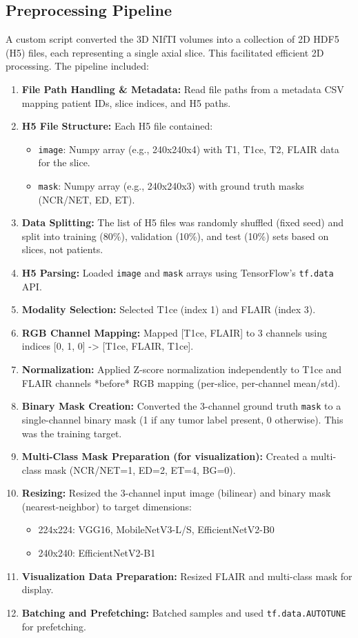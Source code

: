 \subsection{Preprocessing Pipeline}
A custom script converted the 3D NIfTI volumes into a collection of 2D HDF5 (H5) files, each representing a single axial slice. This facilitated efficient 2D processing. The pipeline included:
\begin{enumerate}
  \item \textbf{File Path Handling \& Metadata:} Read file paths from a metadata CSV mapping patient IDs, slice indices, and H5 paths.
  \item \textbf{H5 File Structure:} Each H5 file contained:
    \begin{itemize}
      \item \texttt{image}: Numpy array (e.g., 240x240x4) with T1, T1ce, T2, FLAIR data for the slice.
      \item \texttt{mask}: Numpy array (e.g., 240x240x3) with ground truth masks (NCR/NET, ED, ET).
    \end{itemize}
  \item \textbf{Data Splitting:} The list of H5 files was randomly shuffled (fixed seed) and split into training (80\%), validation (10\%), and test (10\%) sets based on slices, not patients.
  \item \textbf{H5 Parsing:} Loaded \texttt{image} and \texttt{mask} arrays using TensorFlow's \texttt{tf.data} API.
  \item \textbf{Modality Selection:} Selected T1ce (index 1) and FLAIR (index 3).
  \item \textbf{RGB Channel Mapping:} Mapped [T1ce, FLAIR] to 3 channels using indices [0, 1, 0] -> [T1ce, FLAIR, T1ce].
  \item \textbf{Normalization:} Applied Z-score normalization independently to T1ce and FLAIR channels *before* RGB mapping (per-slice, per-channel mean/std).
  \item \textbf{Binary Mask Creation:} Converted the 3-channel ground truth \texttt{mask} to a single-channel binary mask (1 if any tumor label present, 0 otherwise). This was the training target.
  \item \textbf{Multi-Class Mask Preparation (for visualization):} Created a multi-class mask (NCR/NET=1, ED=2, ET=4, BG=0).
  \item \textbf{Resizing:} Resized the 3-channel input image (bilinear) and binary mask (nearest-neighbor) to target dimensions:
    \begin{itemize}
      \item 224x224: VGG16, MobileNetV3-L/S, EfficientNetV2-B0
      \item 240x240: EfficientNetV2-B1
    \end{itemize}
  \item \textbf{Visualization Data Preparation:} Resized FLAIR and multi-class mask for display.
  \item \textbf{Batching and Prefetching:} Batched samples and used \texttt{tf.data.AUTOTUNE} for prefetching.
\end{enumerate}
